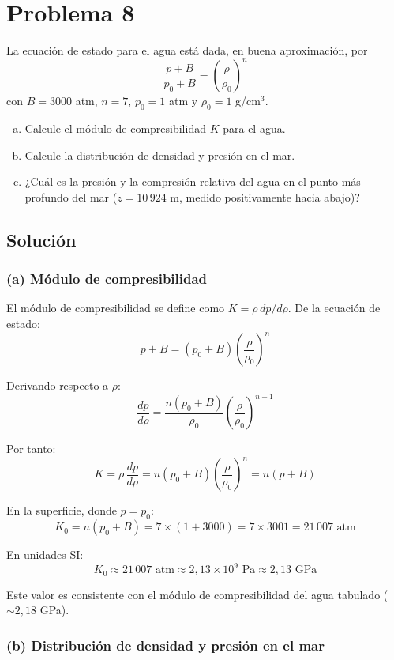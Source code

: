 \documentclass[a4paper]{article}
\begin{document}
\section{Problema 8}
La ecuación de estado para el agua está dada, en buena aproximación, por
$$
\frac{p + B}{p_0 + B} = \left(\frac{\rho}{\rho_0}\right)^n
$$
con $B = 3000$ atm, $n = 7$, $p_0 = 1$ atm y $\rho_0 = 1$ g/cm$^3$.
\begin{enumerate}[a)]
    \item Calcule el módulo de compresibilidad $K$ para el agua.
    \item Calcule la distribución de densidad y presión en el mar.
    \item ¿Cuál es la presión y la compresión relativa del agua en el punto más profundo del mar ($z = 10\,924$ m, medido positivamente hacia abajo)?
\end{enumerate}

\subsection{Solución}

\subsubsection{(a) Módulo de compresibilidad}

El módulo de compresibilidad se define como $K = \rho\, dp/d\rho$. De la ecuación de estado:
$$
p + B = (p_0 + B)\left(\frac{\rho}{\rho_0}\right)^n
$$

Derivando respecto a $\rho$:
$$
\frac{dp}{d\rho} = \frac{n(p_0 + B)}{\rho_0}\left(\frac{\rho}{\rho_0}\right)^{n-1}
$$

Por tanto:
$$
K = \rho\,\frac{dp}{d\rho} = n(p_0 + B)\left(\frac{\rho}{\rho_0}\right)^n = n(p + B)
$$

En la superficie, donde $p = p_0$:
$$
K_0 = n(p_0 + B) = 7 \times (1 + 3000) = 7 \times 3001 = 21\,007 \text{ atm}
$$

En unidades SI:
$$
\boxed{K_0 \approx 21\,007 \text{ atm} \approx 2{,}13 \times 10^9 \text{ Pa} \approx 2{,}13 \text{ GPa}}
$$

Este valor es consistente con el módulo de compresibilidad del agua tabulado ($\sim 2{,}18$ GPa).

\subsubsection{(b) Distribución de densidad y presión en el mar}
\end{document}
